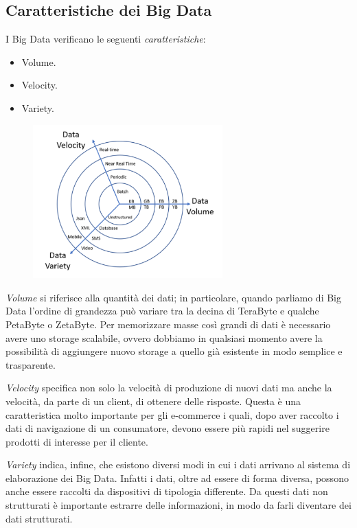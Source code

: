 \documentclass[titlepage]{article}
\begin{document}
\subsection{Caratteristiche dei Big Data}
I Big Data verificano le seguenti \textit{caratteristiche}:
\begin{itemize}
    \item Volume.
    \item Velocity.
    \item Variety.
\end{itemize}
\begin{figure}[htp]
	\centering
	\includegraphics[width=0.65\textwidth]{3V.png}
\end{figure}

\textit{Volume} si riferisce alla quantità dei dati; in particolare, quando parliamo di Big Data l'ordine di grandezza può variare tra la decina di TeraByte e qualche PetaByte o ZetaByte. Per memorizzare masse così grandi di dati è necessario avere uno storage scalabile, ovvero dobbiamo in qualsiasi momento avere la possibilità di aggiungere nuovo storage a quello già esistente in modo semplice e trasparente.

\textit{Velocity} specifica non solo la velocità di produzione di nuovi dati ma anche la velocità, da parte di un client, di ottenere delle risposte. Questa è una caratteristica molto importante per gli e-commerce i quali, dopo aver raccolto i dati di navigazione di un consumatore, devono essere più rapidi nel suggerire prodotti di interesse per il cliente.

\textit{Variety} indica, infine, che esistono diversi modi in cui i dati arrivano al sistema di elaborazione dei Big Data. Infatti i dati, oltre ad essere di forma diversa, possono anche essere raccolti da dispositivi di  tipologia differente. Da questi dati non strutturati è importante estrarre delle informazioni, in modo da farli diventare dei dati strutturati.
\end{document}
